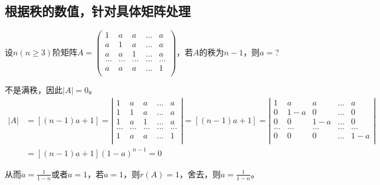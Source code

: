 \subsection{根据秩的数值，针对具体矩阵处理}
\begin{problem}
	设$n(n\geq 3)$阶矩阵$A=\left (
	\begin{matrix}
			1   & a   & a   & ... & a   \\
			a   & 1   & a   & ... & a   \\
			a   & a   & 1   & ... & a   \\
			... & ... & ... & ... & ... \\
			a   & a   & a   & ... & 1   \\
		\end{matrix}
	\right  )$，若$A$的秩为$n-1$，则$a = $?
\end{problem}
\begin{solution}
	不是满秩，因此$|A|=0$。
\begin{align*}
	|A|&=[(n-1)a+1]=\left |
	\begin{matrix}
		1   & a   & a   & ... & a   \\
		1   & 1   & a   & ... & a   \\
		1   & a   & 1   & ... & a   \\
		... & ... & ... & ... & ... \\
		1   & a   & a   & ... & 1   \\
	\end{matrix}
	\right  |=[(n-1)a+1]=\left |
	\begin{matrix}
		1   & a   & a   & ... & a   \\
		0   & 1-a & 0   & ... & 0   \\
		0   & 0   & 1-a & ... & 0   \\
		... & ... & ... & ... & ... \\
		0   & 0   & 0   & ... & 1-a \\
	\end{matrix}
	\right  |\\
	&=[(n-1)a+1](1-a)^{n-1}=0
\end{align*}

从而$a=\frac{1}{1-n}$或者$a=1$，若$a=1$，则$r(A)=1$，舍去，则$a=\frac{1}{1-n}$。
\end{solution}

